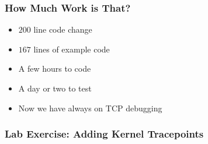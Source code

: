 \documentclass[pdftex]{beamer}
\begin{document}
\begin{frame}
  \frametitle{How Much Work is That?}
  \begin{itemize}
  \item $200$ line code change
  \item $167$ lines of example code
  \item A few hours to code
  \item A day or two to test
  \item Now we have always on TCP debugging
  \end{itemize}
\end{frame}

\begin{frame}
  \frametitle{Lab Exercise: Adding Kernel Tracepoints}
  
\end{frame}
\end{document}

